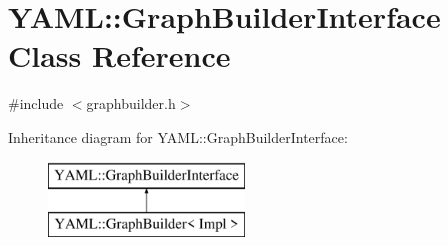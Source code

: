 \hypertarget{class_y_a_m_l_1_1_graph_builder_interface}{}\section{Y\+A\+ML\+::Graph\+Builder\+Interface Class Reference}
\label{class_y_a_m_l_1_1_graph_builder_interface}


{\ttfamily \#include $<$graphbuilder.\+h$>$}

Inheritance diagram for Y\+A\+ML\+::Graph\+Builder\+Interface\+:\begin{figure}[H]
\begin{center}
\leavevmode
\includegraphics[height=2.000000cm]{class_y_a_m_l_1_1_graph_builder_interface}
\end{center}
\end{figure}
